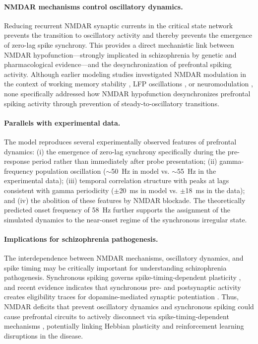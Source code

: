 \documentclass[10pt]{article}
\begin{document}
\paragraph{NMDAR mechanisms control oscillatory dynamics.}
Reducing recurrent NMDAR synaptic currents in the critical state network
prevents the transition to oscillatory activity and thereby prevents the
emergence of zero-lag spike synchrony. This provides a direct mechanistic
link between NMDAR hypofunction---strongly implicated in schizophrenia by
genetic and pharmacological evidence---and the desynchronization of
prefrontal spiking activity. Although earlier modeling studies investigated
NMDAR modulation in the context of working memory stability
\citep{wang1999synaptic, compte2000synaptic}, LFP oscillations
\citep{brunel2003fast}, or neuromodulation \citep{brunel2001effects}, none
specifically addressed how NMDAR hypofunction desynchronizes prefrontal
spiking activity through prevention of steady-to-oscillatory transitions.

\paragraph{Parallels with experimental data.}
The model reproduces several experimentally observed features of prefrontal
dynamics: (i) the emergence of zero-lag synchrony specifically during the
pre-response period rather than immediately after probe presentation;
(ii) gamma-frequency population oscillation ($\sim$50~Hz in model vs.
$\sim$55~Hz in the experimental data); (iii) temporal correlation structure
with peaks at lags consistent with gamma periodicity ($\pm$20~ms in model
vs. $\pm$18~ms in the data); and (iv) the abolition of these features by
NMDAR blockade. The theoretically predicted onset frequency of 58~Hz further
supports the assignment of the simulated dynamics to the near-onset regime
of the synchronous irregular state.

\paragraph{Implications for schizophrenia pathogenesis.}
The interdependence between NMDAR mechanisms, oscillatory dynamics, and
spike timing may be critically important for understanding schizophrenia
pathogenesis. Synchronous spiking governs spike-timing-dependent plasticity
\citep{dan2004spike}, and recent evidence indicates that synchronous pre-
and postsynaptic activity creates eligibility traces for dopamine-mediated
synaptic potentiation \citep{he2015eligibility, yagishita2014critical}.
Thus, NMDAR deficits that prevent oscillatory dynamics and synchronous
spiking could cause prefrontal circuits to actively disconnect via
spike-timing-dependent mechanisms \citep{zick2021disparate}, potentially
linking Hebbian plasticity and reinforcement learning disruptions in the
disease.
\end{document}

